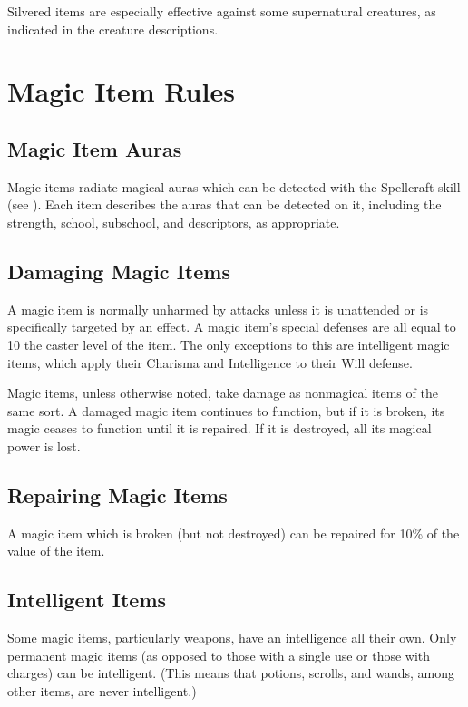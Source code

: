 Silvered items are especially effective against some supernatural creatures, as indicated in the creature descriptions.

\section{Magic Item Rules}

\subsection{Magic Item Auras}

Magic items radiate magical auras which can be detected with the Spellcraft skill (see ). Each item describes the auras that can be detected on it, including the strength, school, subschool, and descriptors, as appropriate.

\subsection{Damaging Magic Items}

A magic item is normally unharmed by attacks unless it is unattended or is specifically targeted by an effect. A magic item's special defenses are all equal to 10 \add the caster level of the item. The only exceptions to this are intelligent magic items, which apply their Charisma and Intelligence to their Will defense.

Magic items, unless otherwise noted, take damage as nonmagical items of the same sort. A damaged magic item continues to function, but if it is broken, its magic ceases to function until it is repaired. If it is destroyed, all its magical power is lost.

\subsection{Repairing Magic Items}

A magic item which is broken (but not destroyed) can be repaired for 10\% of the value of the item. 

\subsection{Intelligent Items}

Some magic items, particularly weapons, have an intelligence all their own. Only permanent magic items (as opposed to those with a single use or those with charges) can be intelligent. (This means that potions, scrolls, and wands, among other items, are never intelligent.)

